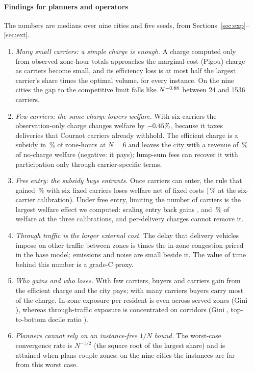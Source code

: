 \documentclass[preprint,11pt,authoryear]{elsarticle}
\theoremstyle{plain}
\theoremstyle{remark}
\begin{document}
\paragraph{Findings for planners and operators} The numbers are medians over nine cities and five seeds, from Sections~\ref{sec:exp}--\ref{sec:ext}.
\begin{enumerate}
\renewcommand{\labelenumi}{(\alph{enumi})}
\item \emph{Many small carriers: a simple charge is enough.} A charge computed only from observed zone-hour totals approaches the marginal-cost (Pigou) charge as carriers become small, and its efficiency loss is at most half the largest carrier's share times the optimal volume, for every instance. On the nine cities the gap to the competitive limit falls like $N^{-0.88}$ between 24 and 1536 carriers.
\item \emph{Few carriers: the same charge lowers welfare.} With six carriers the observation-only charge changes welfare by $-0.45\%$, because it taxes deliveries that Cournot carriers already withhold. The efficient charge is a subsidy in \PmNegShare\,\% of zone-hours at $N=6$ and leaves the city with a revenue of \WSixPmR\,\% of no-charge welfare (negative: it pays); lump-sum fees can recover it with participation only through carrier-specific terms.
\item \emph{Free entry: the subsidy buys entrants.} Once carriers can enter, the rule that gained \WSixPmdSW\,\% with six fixed carriers loses welfare net of fixed costs (\EntSixPmdSW\,\% at the six-carrier calibration). Under free entry, limiting the number of carriers is the largest welfare effect we computed: scaling entry back gains \EntSixMwGain, \EntTwentyFourMwGain{} and \EntOneNinetyTwoMwGain\,\% of welfare at the three calibrations, and per-delivery charges cannot remove it.
\item \emph{Through traffic is the larger external cost.} The delay that delivery vehicles impose on other traffic between zones is \ExtRatioKQ{} times the in-zone congestion priced in the base model; emissions and noise are small beside it. The value of time behind this number is a grade-C proxy.
\item \emph{Who gains and who loses.} With few carriers, buyers and carriers gain from the efficient charge and the city pays; with many carriers buyers carry most of the charge. In-zone exposure per resident is even across served zones (Gini \ExpBigGiniNone), whereas through-traffic exposure is concentrated on corridors (Gini \ExpGiniNone, top-to-bottom decile ratio \ExpDtenNone).
\item \emph{Planners cannot rely on an instance-free $1/N$ bound.} The worst-case convergence rate is $N^{-1/2}$ (the square root of the largest share) and is attained when plans couple zones; on the nine cities the instances are far from this worst case.
\end{enumerate}
\end{document}
